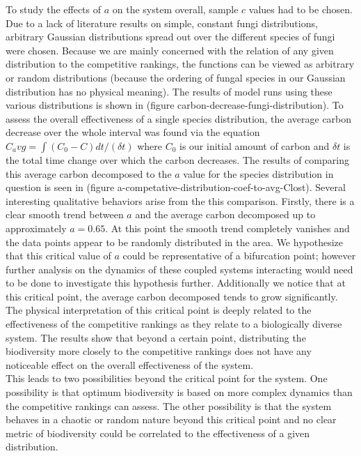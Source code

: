 \documentclass{article}
\begin{document}
To study the effects of $a$ on the system overall, sample $c$ values had to be chosen. Due to a lack of literature results on simple, constant fungi distributions, arbitrary Gaussian distributions spread out over the different species of fungi were chosen. Because we are mainly concerned with the relation of any given distribution to the competitive rankings, the functions can be viewed as arbitrary or random distributions (because the ordering of fungal species in our Gaussian distribution has no physical meaning). The results of model runs using these various distributions is shown in (figure carbon-decrease-fungi-distribution). To assess the overall effectiveness of a single species distribution, the average carbon decrease over the whole interval was found via the equation $C_avg = \int (C_{0}-C)dt/(\delta t)$ where $C_{0}$ is our initial amount of carbon and $\delta t$ is the total time change over which the carbon decreases. The results of comparing this average carbon decomposed to the $a$ value for the species distribution in question is seen in (figure a-competative-distribution-coef-to-avg-Clost). Several interesting qualitative behaviors arise from the this comparison. Firstly, there is a clear smooth trend between $a$ and the average carbon decomposed up to approximately $a=0.65$. At this point the smooth trend completely vanishes and the data points appear to be randomly distributed in the area. We hypothesize that this critical value of $a$ could be representative of a bifurcation point; however further analysis on the dynamics of these coupled systems interacting would need to be done to investigate this hypothesis further. Additionally we notice that at this critical point, the average carbon decomposed tends to grow significantly. The physical interpretation of this critical point is deeply related to the effectiveness of the competitive rankings as they relate to a biologically diverse system. The results show that beyond a certain point, distributing the biodiversity more closely to the competitive rankings does not have any noticeable effect on the overall effectiveness of the system. \\
This leads to two possibilities beyond the critical point for the system. One possibility is that optimum biodiversity is based on more complex dynamics than the competitive rankings can assess. The other possibility is that the system behaves in a chaotic or random nature beyond this critical point and no clear metric of biodiversity could be correlated to the effectiveness of a given distribution.
\end{document}
